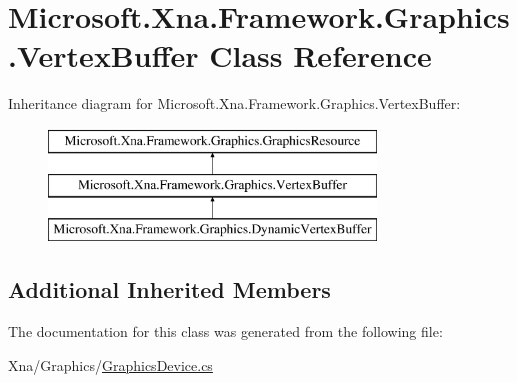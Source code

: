 \hypertarget{class_microsoft_1_1_xna_1_1_framework_1_1_graphics_1_1_vertex_buffer}{}\section{Microsoft.\+Xna.\+Framework.\+Graphics.\+Vertex\+Buffer Class Reference}
\label{class_microsoft_1_1_xna_1_1_framework_1_1_graphics_1_1_vertex_buffer}
Inheritance diagram for Microsoft.\+Xna.\+Framework.\+Graphics.\+Vertex\+Buffer\+:\begin{figure}[H]
\begin{center}
\leavevmode
\includegraphics[height=3.000000cm]{class_microsoft_1_1_xna_1_1_framework_1_1_graphics_1_1_vertex_buffer}
\end{center}
\end{figure}
\subsection*{Additional Inherited Members}


The documentation for this class was generated from the following file\+:\begin{DoxyCompactItemize}
\item 
Xna/\+Graphics/\hyperlink{_graphics_device_8cs}{Graphics\+Device.\+cs}\end{DoxyCompactItemize}
